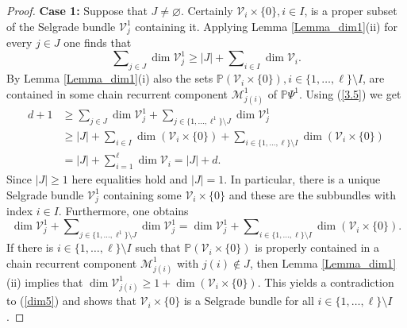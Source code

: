 \begin{proof}
		\textbf{Case 1:} Suppose that $J\not =\varnothing$. Certainly $\mathcal{V}%
		_{i}\times\{0\},i\in I$, is a proper subset of the Selgrade bundle
		$\mathcal{V}_{j}^{1}$ containing it. Applying Lemma \ref{Lemma_dim1}(ii) for
		every $j\in J$ one finds that
		\begin{equation}
			\sum\nolimits_{j\in J}\dim\mathcal{V}_{j}^{1}\geq\left\vert J\right\vert
			+\sum\nolimits_{i\in I}\dim\mathcal{V}_{i}. \label{3.5}%
		\end{equation}
		By Lemma \ref{Lemma_dim1}(i) also the sets $\mathbb{P}\left(  \mathcal{V}%
		_{i}\times\{0\}\right)  ,i\in\{1,\ldots,\ell\}\setminus I$, are contained in
		some chain recurrent component $\mathcal{M}_{j(i)}^{1}$ of $\mathbb{P}\Psi
		^{1}$. Using (\ref{3.5}) we get
		\begin{align}
			d+1  &  \geq\sum\nolimits_{j\in J}\dim\mathcal{V}_{j}^{1}+\sum\nolimits_{j\in
				\{1,\ldots,\ell^{1}\}\setminus J}\dim\mathcal{V}_{j}^{1}\nonumber\\
			&  \geq\left\vert J\right\vert +\sum\nolimits_{i\in I}\dim(\mathcal{V}%
			_{i}\times\{0\})+\sum\nolimits_{i\in\{1,\ldots,\ell\}\setminus I}\dim\left(
			\mathcal{V}_{i}\times\{0\}\right) \label{dim3}\\
			&  =\left\vert J\right\vert +\sum\nolimits_{i=1}^{\ell}\dim\mathcal{V}%
			_{i}=\left\vert J\right\vert +d.\nonumber
		\end{align}
		Since $\left\vert J\right\vert \geq1$ here equalities hold and $\left\vert
		J\right\vert =1$. In particular, there is a unique Selgrade bundle
		$\mathcal{V}_{j}^{1}$ containing some $\mathcal{V}_{i}\times\{0\}$ and these
		are the subbundles with index $i\in I$. Furthermore, one obtains%
		\begin{equation}
			\dim\mathcal{V}_{j}^{1}+\sum\nolimits_{j\in\{1,\ldots,\ell^{1}\}\setminus
				J}\dim\mathcal{V}_{j}^{1}=\dim\mathcal{V}_{j}^{1}+\sum\nolimits_{i\in
				\{1,\ldots,\ell\}\setminus I}\dim\left(  \mathcal{V}_{i}\times\{0\}\right)  .
			\label{dim5}%
		\end{equation}
		If there is $i\in\{1,\ldots,\ell\}\setminus I$ such that $\mathbb{P}\left(
		\mathcal{V}_{i}\times\{0\}\right)  $ is properly contained in a chain
		recurrent component $\mathcal{M}_{j(i)}^{1}$ with $j(i)\not \in J$, then Lemma
		\ref{Lemma_dim1}(ii) implies that $\dim\mathcal{V}_{j(i)}^{1}\geq1+\dim\left(
		\mathcal{V}_{i}\times\{0\}\right)  $. This yields a contradiction to
		(\ref{dim5}) and shows that $\mathcal{V}_{i}\times\{0\}$ is a Selgrade bundle
		for all $i\in\{1,\ldots,\ell\}\setminus I$.
		

\end{proof}
